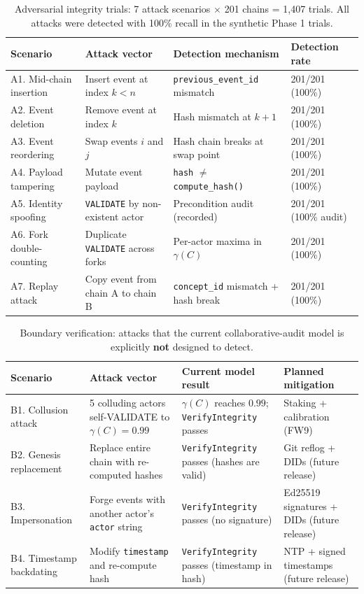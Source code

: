 \begin{table}[htbp]
\centering
\small
\caption{Adversarial integrity trials: 7 attack scenarios \texorpdfstring{$\times$}{x} 201 chains = 1,407 trials. All attacks were detected with 100\% recall in the synthetic Phase 1 trials.}
\label{tab:adversarial-results}
\begin{tabular}{@{}p{2.8cm}p{3.2cm}p{4.5cm}p{2.8cm}@{}}
\toprule
\textbf{Scenario} & \textbf{Attack vector} & \textbf{Detection mechanism} & \textbf{Detection rate} \\
\midrule
A1. Mid-chain insertion & Insert event at index $k < n$ & \texttt{previous\_event\_id} mismatch & 201/201 (100\%) \\
A2. Event deletion & Remove event at index $k$ & Hash mismatch at $k+1$ & 201/201 (100\%) \\
A3. Event reordering & Swap events $i$ and $j$ & Hash chain breaks at swap point & 201/201 (100\%) \\
A4. Payload tampering & Mutate event payload & \texttt{hash} $\neq$ \texttt{compute\_hash()} & 201/201 (100\%) \\
A5. Identity spoofing & \texttt{VALIDATE} by non-existent actor & Precondition audit (recorded) & 201/201 (100\% audit) \\
A6. Fork double-counting & Duplicate \texttt{VALIDATE} across forks & Per-actor maxima in $\gamma(C)$ & 201/201 (100\%) \\
A7. Replay attack & Copy event from chain A to chain B & \texttt{concept\_id} mismatch + hash break & 201/201 (100\%) \\
\bottomrule
\end{tabular}
\end{table}

\begin{table}[htbp]
\centering
\small
\caption{Boundary verification: attacks that the current collaborative-audit model is explicitly \textbf{not} designed to detect.}
\label{tab:undetectable-attacks}
\begin{tabular}{@{}p{2.5cm}p{3.5cm}p{3.5cm}p{3.5cm}@{}}
\toprule
\textbf{Scenario} & \textbf{Attack vector} & \textbf{Current model result} & \textbf{Planned mitigation} \\
\midrule
B1. Collusion attack & 5 colluding actors self-VALIDATE to $\gamma(C)=0.99$ & $\gamma(C)$ reaches $0.99$; \texttt{VerifyIntegrity} passes & Staking + calibration (FW9) \\
B2. Genesis replacement & Replace entire chain with re-computed hashes & \texttt{VerifyIntegrity} passes (hashes are valid) & Git reflog + DIDs (future release) \\
B3. Impersonation & Forge events with another actor's \texttt{actor} string & \texttt{VerifyIntegrity} passes (no signature) & Ed25519 signatures + DIDs (future release) \\
B4. Timestamp backdating & Modify \texttt{timestamp} and re-compute hash & \texttt{VerifyIntegrity} passes (timestamp in hash) & NTP + signed timestamps (future release) \\
\bottomrule
\end{tabular}
\end{table}

